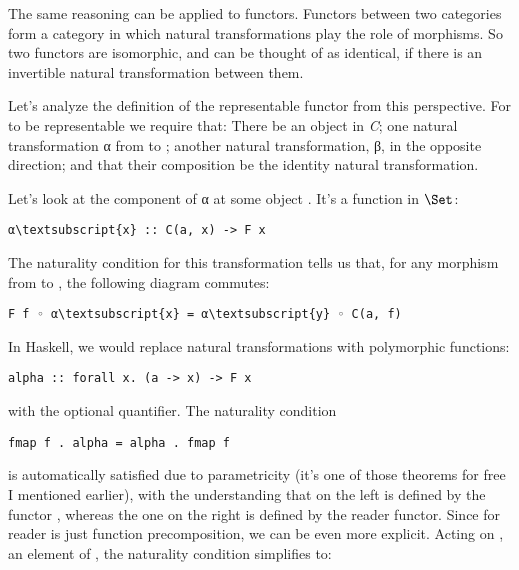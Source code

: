 The same reasoning can be applied to functors. Functors between two
categories form a category in which natural transformations play the
role of morphisms. So two functors are isomorphic, and can be thought of
as identical, if there is an invertible natural transformation between
them.

Let's analyze the definition of the representable functor from this
perspective. For  to be representable we require that: There
be an object  in \emph{C}; one natural transformation α from
 to ; another natural transformation, β, in
the opposite direction; and that their composition be the identity
natural transformation.

Let's look at the component of α at some object . It's a
function in $\Set$:

\begin{Verbatim}[commandchars=\\\{\}]
α\textsubscript{x} :: C(a, x) -> F x
\end{Verbatim}
The naturality condition for this transformation tells us that, for any
morphism  from  to , the following diagram
commutes:

\begin{Verbatim}[commandchars=\\\{\}]
F f ◦ α\textsubscript{x} = α\textsubscript{y} ◦ C(a, f)
\end{Verbatim}
In Haskell, we would replace natural transformations with polymorphic
functions:

\begin{Verbatim}[commandchars=\\\{\}]
alpha :: forall x. (a -> x) -> F x
\end{Verbatim}
with the optional  quantifier. The naturality condition

\begin{Verbatim}[commandchars=\\\{\}]
fmap f . alpha = alpha . fmap f
\end{Verbatim}
is automatically satisfied due to parametricity (it's one of those
theorems for free I mentioned earlier), with the understanding that
 on the left is defined by the functor , whereas
the one on the right is defined by the reader functor. Since
 for reader is just function precomposition, we can be even
more explicit. Acting on , an element of ,
the naturality condition simplifies to:

